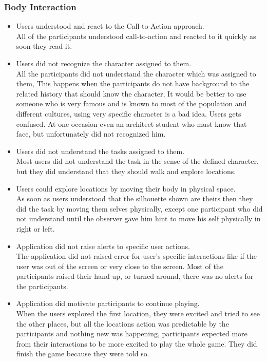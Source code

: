 \subsubsection{Body Interaction}
\begin{itemize}
\item Users understood and react to the Call-to-Action approach. \\
All of the participants understood call-to-action and reacted to it quickly as soon they read it.

\item Users did not recognize the character assigned to them.\\ 
All the participants did not understand the character which was assigned to them, This happens when the participants do not have background to the related history that should know the character, It would be better to use someone who is very famous and is known to most of the population and different cultures, using very specific character is a bad idea. Users gets confused. At one occasion even an architect student who must know that face, but unfortunately did not recognized him. 

\item Users did not understand the tasks assigned to them.  \\ 
Most users did not understand the task in the sense of the defined character, but they did understand that they should walk and explore locations.

\item Users could explore locations by moving their body in physical space. \\ 
As soon as users understood that the silhouette shown are theirs then they did the task by moving them selves physically, except one participant who did not understand until the observer gave him hint to move his self physically in right or left.

\item Application did not raise alerts to specific user actions.   \\ 
The application did not raised error for user's specific interactions like if the user was out of the screen or very close to the screen. Most of the participants raised their hand up, or turned around, there was no alerts for the participants.

\item Application did motivate participants to continue playing. \\ 
When the users explored the first location, they were excited and tried to see the other places, but all the locations action was predictable by the participants and nothing new was happening, participants expected more from their interactions to be more excited to play the whole game. They did finish the game because they were told so.

\end{itemize}


